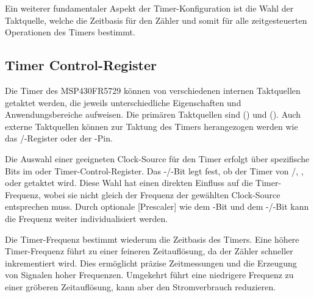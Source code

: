Ein weiterer fundamentaler Aspekt der Timer-Konfiguration ist \ua die Wahl der Taktquelle, welche die Zeitbasis f\"ur den Z\"ahler und somit f\"ur alle zeitgesteuerten Operationen des Timers bestimmt.\AI

\subsection{Timer Control-Register}
\label{sec:TimerControlRegister}

Die Timer des MSP430FR5729 k\"onnen von verschiedenen internen Taktquellen getaktet werden, die jeweils unterschiedliche Eigenschaften und Anwendungsbereiche aufweisen. Die prim\"aren Taktquellen sind  () und  (). Auch externe Taktquellen k\"onnen zur Taktung des Timers herangezogen werden wie \zB das /-Register oder der -Pin. \\

Die Auswahl einer geeigneten \glqq Clock-Source\grqq{} f\"ur den Timer erfolgt \"uber spezifische Bits im  oder  Timer-Control-Register. Das -/-Bit legt fest, ob der Timer von /, ,  oder  getaktet wird. Diese Wahl hat einen direkten Einfluss auf die Timer-Frequenz, wobei sie nicht gleich der Frequenz der gew\"ahlten Clock-Source entsprechen muss. Durch optionale [Prescaler] wie dem -Bit und dem -/-Bit kann die Frequenz weiter individualisiert werden. 

\newpage
Die Timer-Frequenz bestimmt wiederum die Zeitbasis des Timers. Eine h\"ohere Timer-Frequenz f\"uhrt zu einer feineren Zeitaufl\"osung, da der Z\"ahler schneller inkrementiert wird. Dies erm\"oglicht pr\"azise Zeitmessungen und die Erzeugung von Signalen hoher Frequenzen. Umgekehrt f\"uhrt eine niedrigere Frequenz zu einer gr\"oberen Zeitaufl\"osung, kann aber den Stromverbrauch reduzieren.

